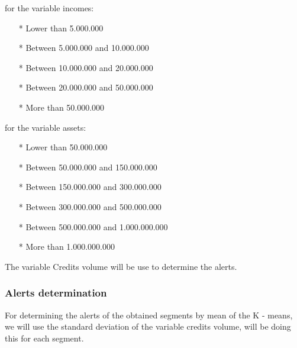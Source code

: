 for the variable incomes:
\begin{itemize}
\item[*] Lower than 5.000.000
\item[*] Between 5.000.000 and 10.000.000
\item[*] Between 10.000.000 and 20.000.000
\item[*] Between 20.000.000 and 50.000.000
\item[*] More than 50.000.000
\end{itemize}
for the variable assets:
\begin{itemize}
\item[*] Lower than 50.000.000
\item[*] Between 50.000.000 and 150.000.000
\item[*] Between 150.000.000 and 300.000.000
\item[*] Between 300.000.000 and 500.000.000
\item[*] Between 500.000.000 and 1.000.000.000
\item[*] More than 1.000.000.000
\end{itemize}
The variable Credits volume will be use to determine the alerts.
\subsubsection{Alerts determination}
For determining the alerts of the obtained segments by mean of the K - means, we will use the standard deviation of the variable credits volume, will be doing this for each segment.
%
